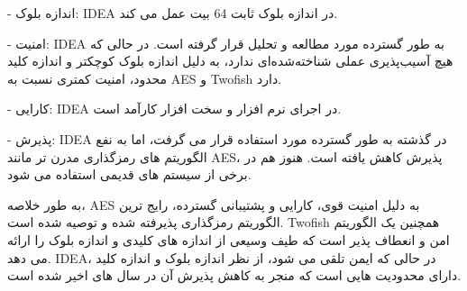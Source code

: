 \begin{boxB}
    - اندازه بلوک: IDEA در اندازه بلوک ثابت 64 بیت عمل می کند.
    
    - امنیت: IDEA به طور گسترده مورد مطالعه و تحلیل قرار گرفته است. در حالی که هیچ آسیب‌پذیری عملی شناخته‌شده‌ای ندارد، به دلیل اندازه بلوک کوچکتر و اندازه کلید محدود، امنیت کمتری نسبت به AES و Twofish دارد.
    
    - کارایی: IDEA در اجرای نرم افزار و سخت افزار کارآمد است.
    
    - پذیرش: IDEA در گذشته به طور گسترده مورد استفاده قرار می گرفت، اما به نفع الگوریتم های رمزگذاری مدرن تر مانند AES، پذیرش کاهش یافته است. هنوز هم در برخی از سیستم های قدیمی استفاده می شود.

به طور خلاصه، AES به دلیل امنیت قوی، کارایی و پشتیبانی گسترده، رایج ترین الگوریتم رمزگذاری پذیرفته شده و توصیه شده است. Twofish همچنین یک الگوریتم امن و انعطاف پذیر است که طیف وسیعی از اندازه های کلیدی و اندازه بلوک را ارائه می دهد. IDEA، در حالی که ایمن تلقی می شود، از نظر اندازه بلوک و اندازه کلید دارای محدودیت هایی است که منجر به کاهش پذیرش آن در سال های اخیر شده است.
\end{boxB}